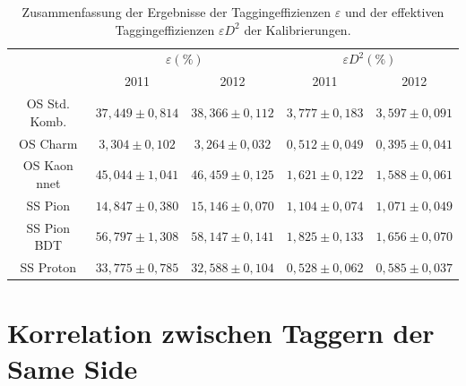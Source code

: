 \begin{table}[htbp]
	\centering
	\caption{Zusammenfassung der Ergebnisse der Taggingeffizienzen $\varepsilon$ und der effektiven Taggingeffizienzen $\varepsilon D^2$ der Kalibrierungen.}
	\label{tab:diskussion}
	\begin{tabular}{ccccc}
	\toprule
       		& \multicolumn{2}{c}{$\varepsilon(\%)$} & \multicolumn{2}{c}{$\varepsilon D^2(\%)$}\\
		& \num{2011} & \num{2012} & \num{2011} & \num{2012} \\ 
		\midrule
   OS Std. Komb. & $37{,}449\pm0{,}814$& $38{,}366\pm0{,}112$ & $3{,}777\pm0{,}183$ & $3{,}597\pm0{,}091$\\ 
   OS Charm & $3{,}304\pm0{,}102$& $3{,}264\pm0{,}032$ & $0{,}512\pm0{,}049$ & $0{,}395\pm0{,}041$\\ 
   OS Kaon nnet & $45{,}044\pm1{,}041$& $46{,}459\pm0{,}125$ & $1{,}621\pm0{,}122$ & $1{,}588\pm0{,}061$\\ 
   SS Pion & $14{,}847\pm0{,}380$& $15{,}146\pm0{,}070$ & $1{,}104\pm0{,}074$ & $1{,}071\pm0{,}049$\\ 
   SS Pion BDT & $56{,}797\pm1{,}308$& $58{,}147\pm0{,}141$ & $1{,}825\pm0{,}133$ & $1{,}656\pm0{,}070$\\ 
   SS Proton & $33{,}775\pm0{,}785$& $32{,}588\pm0{,}104$ & $0{,}528\pm0{,}062$ & $0{,}585\pm0{,}037$\\ 
   \bottomrule
   \end{tabular}
\end{table}

\section{Korrelation zwischen Taggern der Same Side}

